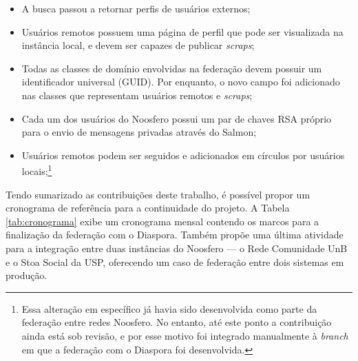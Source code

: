 \begin{itemize}
  \item{A busca passou a retornar perfis de usuários externos;}
  \item{Usuários remotos possuem uma página de perfil que pode ser visualizada na
        instância local, e devem ser capazes de publicar \textit{scraps};}
  \item{Todas as classes de domínio envolvidas na federação devem possuir um
        identificador universal (GUID). Por enquanto, o novo campo foi adicionado
        nas classes que representam usuários remotos e \textit{scraps};}
  \item{Cada um dos usuários do Noosfero possui um par de chaves RSA próprio para o
        envio de mensagens privadas através do Salmon;}
  \item{Usuários remotos podem ser seguidos e adicionados em círculos por usuários
        locais;\footnote{Essa alteração em específico já havia sido desenvolvida
        como parte da federação entre redes Noosfero. No entanto, até este ponto a
        contribuição ainda está sob revisão, e por esse motivo foi integrado
        manualmente à \textit{branch} em que a federação com o Diaspora foi
        desenvolvida.}}
\end{itemize}

Tendo sumarizado as contribuições deste trabalho, é possível propor um cronograma de
referência para a continuidade do projeto. A Tabela \ref{tab:cronograma} exibe um
cronograma mensal contendo os marcos para a finalização da federação com o Diaspora.
Também propõe uma última atividade para a integração entre duas instâncias do
Noosfero --- o Rede Comunidade UnB e o Stoa Social da USP, oferecendo um caso de
federação entre dois sistemas em produção.

